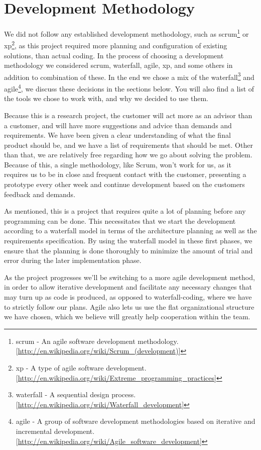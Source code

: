 \section{Development Methodology}\label{Development Methodology} 
    We did not follow any established development methodology, such as \gls{scrum}\footnote{\gls{scrum} - An agile software development methodology. [\url{http://en.wikipedia.org/wiki/Scrum_(development)}]} or \gls{xp}\footnote{\gls{xp} - A type of agile software development. [\url{http://en.wikipedia.org/wiki/Extreme_programming_practices}]}, as this project required more planning and configuration of existing solutions, than actual coding. In the process of choosing a development methodology we considered scrum, waterfall, agile, xp, and some others in addition to combination of these. In the end we chose a mix of the \gls{waterfall}\footnote{\gls{waterfall} - A sequential design process. [\url{http://en.wikipedia.org/wiki/Waterfall_development}]} and \gls{agile}\footnote{\gls{agile} - A group of software development methodologies based on iterative and incremental development. [\url{http://en.wikipedia.org/wiki/Agile_software_development}]}, we discuss these decisions in the sections below. You will also find a list of the tools we chose to work with, and why we decided to use them. 
    
    Because this is a research project, the customer will act more as an advisor than a customer, and will have more suggestions and advice than demands and requirements. We have been given a clear understanding of what the final product should be, and we have a list of requirements that should be met. Other than that, we are relatively free regarding how we go about solving the problem. Because of this, a single methodology, like Scrum, won't work for us, as it requires us to be in close and frequent contact with the customer, presenting a prototype every other week and continue development based on the customers feedback and demands.
    
    As mentioned, this is a project that requires quite a lot of planning before any programming can be done. This necessitates that we start the development according to a waterfall model in terms of the architecture planning as well as the requirements specification. By using the waterfall model in these first phases, we ensure that the planning is done thoroughly to minimize the amount of trial and error during the later implementation phase.
    
    As the project progresses we'll be switching to a more agile development method, in order to allow iterative development and facilitate any necessary changes that may turn up as code is produced, as opposed to waterfall-coding, where we have to strictly follow our plans. Agile also lets us use the flat organizational structure we have chosen, which we believe will greatly help cooperation within the team.
    
